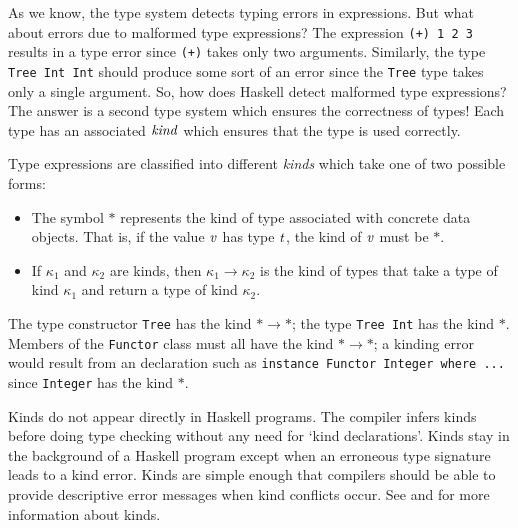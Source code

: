 
As we know, the type system detects typing errors in expressions.  But
what about errors due to malformed type expressions?  The expression
\mbox{\tt (+)\ 1\ 2\ 3} results in a type error since \mbox{\tt (+)} takes only two arguments.
Similarly, the type \mbox{\tt Tree\ Int\ Int} should produce some sort of an
error since the \mbox{\tt Tree} type takes only a single argument.  So, how
does Haskell detect malformed type expressions?  The answer is a second
type system which ensures the correctness of types!  Each
type has an associated \mbox{$\it kind$} which ensures that the type is used
correctly.

Type expressions are classified into different {\em kinds} which take
one of two possible forms:
\begin{itemize}
\item The symbol $\ast$ represents the kind of type associated with
concrete data objects.  That is, if the value \mbox{$\it v$} has type \mbox{$\it t$}, the
kind of \mbox{$\it v$} must be $\ast$.

\item If $\kappa_1$ and $\kappa_2$ are kinds, then
$\kappa_1\rightarrow\kappa_2$ is the kind of types that take a type of
kind $\kappa_1$ and return a type of kind $\kappa_2$.
\end{itemize}
The type constructor \mbox{\tt Tree} has the kind $\ast\rightarrow\ast$; the
type \mbox{\tt Tree\ Int} has the kind $\ast$.  Members of the \mbox{\tt Functor} class
must all have the kind $\ast\rightarrow\ast$; a kinding error would
result from an declaration such as 
\bprog
\mbox{\tt instance\ Functor\ Integer\ where\ ...}
\eprog
since \mbox{\tt Integer} has the kind $\ast$.  

Kinds do not appear directly in Haskell programs.
The compiler infers kinds before doing type checking without any need
for `kind declarations'.  Kinds stay in the background of a Haskell
program except when an erroneous  type signature leads to a kind
error.  Kinds are 
simple enough that compilers should be able to provide descriptive
error messages when kind conflicts occur.  See 
 and  for more information about
kinds.

